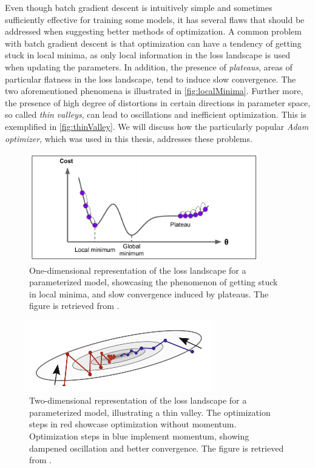 Even though batch gradient descent is intuitively simple and sometimes sufficiently effective for training some models, it has several flaws that should be addressed when suggesting better methods of optimization. A common problem with batch gradient descent is that optimization can have a tendency of getting stuck in local minima, as only local information in the loss landscape is used when updating the parameters. In addition, the presence of \emph{plateaus}, areas of particular flatness in the loss landscape, tend to induce slow convergence. The two aforementioned phenomena is illustrated in \autoref{fig:localMinima}. Further more, the presence of high degree of distortions in certain directions in parameter space, so called  \emph{thin valleys}, can lead to oscillations and inefficient optimization. This is exemplified in \autoref{fig:thinValley}. We will discuss how the particularly popular \emph{Adam optimizer}, which was used in this thesis, addresses these problems. 


\begin{figure}[htp]
    \centering
    \includegraphics[width=10cm]{latex/figures/local_minimum_saddle_point.png}
    \caption{One-dimensional representation of the loss landscape for a parameterized model, showcasing the phenomenon of getting stuck in local minima, and slow convergence induced by plateaus. The figure is retrieved from \citet{hands-on}.}
    \label{fig:localMinima}
\end{figure}

\begin{figure}[htp]
    \centering
    \includegraphics[width=8cm]{latex/figures/thin_vally.png}
    \caption{Two-dimensional representation of the loss landscape for a parameterized model, illustrating a thin valley. The optimization steps in red showcase optimization without momentum. Optimization steps in blue implement momentum, showing dampened oscillation and better convergence. The figure is retrieved from \citet{SupervisedwquantumComputers}.}
    \label{fig:thinValley}
\end{figure}

